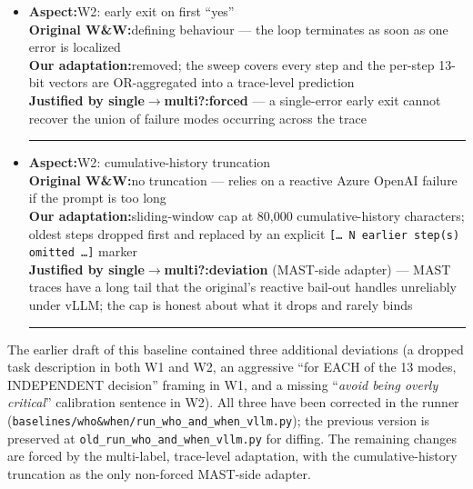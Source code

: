 \begin{itemize}
\item \textbf{Aspect:}\enspace \textsc{W2}: early exit on first ``yes''\\
      \textbf{Original W\&W:}\enspace defining behaviour --- the loop terminates as soon as one error is localized\\
      \textbf{Our adaptation:}\enspace removed; the sweep covers every step and the per-step 13-bit vectors are OR-aggregated into a trace-level prediction\\
      \textbf{Justified by single$\to$multi?:}\enspace \textbf{forced} --- a single-error early exit cannot recover the union of failure modes occurring across the trace\\
      \rule{\linewidth}{0.4pt}

\item \textbf{Aspect:}\enspace \textsc{W2}: cumulative-history truncation\\
      \textbf{Original W\&W:}\enspace no truncation --- relies on a reactive Azure OpenAI failure if the prompt is too long\\
      \textbf{Our adaptation:}\enspace sliding-window cap at 80{,}000 cumulative-history characters; oldest steps dropped first and replaced by an explicit \texttt{[\ldots\ N earlier step(s) omitted \ldots]} marker\\
      \textbf{Justified by single$\to$multi?:}\enspace \textbf{deviation} (MAST-side adapter) --- MAST traces have a long tail that the original's reactive bail-out handles unreliably under vLLM; the cap is honest about what it drops and rarely binds\\
      \rule{\linewidth}{0.4pt}

\end{itemize}

The earlier draft of this baseline contained three additional deviations
(a dropped task description in both \textsc{W1} and \textsc{W2}, an
aggressive ``for EACH of the 13 modes, INDEPENDENT decision'' framing
in \textsc{W1}, and a missing
``\emph{avoid being overly critical}'' calibration sentence in
\textsc{W2}). All three have been corrected in the runner
(\texttt{baselines/who\&when/run\_who\_and\_when\_vllm.py}); the
previous version is preserved at
\texttt{old\_run\_who\_and\_when\_vllm.py} for diffing. The remaining
changes are forced by the multi-label, trace-level adaptation, with
the cumulative-history truncation as the only non-forced MAST-side
adapter.
